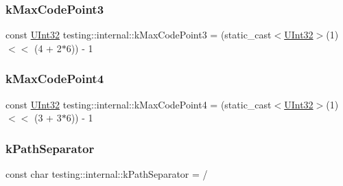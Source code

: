 \mbox{\label{namespacetesting_1_1internal_aa42bd507418e570402996e33582beed3}} 
\subsubsection{\texorpdfstring{kMaxCodePoint3}{kMaxCodePoint3}}
{\footnotesize\ttfamily const \mbox{\hyperlink{namespacetesting_1_1internal_a436defbb8e92c8e94e33ebcc86f278ba}{U\+Int32}} testing\+::internal\+::k\+Max\+Code\+Point3 = (static\+\_\+cast$<$\mbox{\hyperlink{namespacetesting_1_1internal_a436defbb8e92c8e94e33ebcc86f278ba}{U\+Int32}}$>$(1) $<$$<$ (4 + 2$\ast$6)) -\/ 1}

\mbox{\label{namespacetesting_1_1internal_acd87c60be9b5fedb2d017503d8834474}} 
\subsubsection{\texorpdfstring{kMaxCodePoint4}{kMaxCodePoint4}}
{\footnotesize\ttfamily const \mbox{\hyperlink{namespacetesting_1_1internal_a436defbb8e92c8e94e33ebcc86f278ba}{U\+Int32}} testing\+::internal\+::k\+Max\+Code\+Point4 = (static\+\_\+cast$<$\mbox{\hyperlink{namespacetesting_1_1internal_a436defbb8e92c8e94e33ebcc86f278ba}{U\+Int32}}$>$(1) $<$$<$ (3 + 3$\ast$6)) -\/ 1}

\mbox{\label{namespacetesting_1_1internal_afcd71adaa9d1e6df7b282a17fc48125c}} 
\subsubsection{\texorpdfstring{kPathSeparator}{kPathSeparator}}
{\footnotesize\ttfamily const char testing\+::internal\+::k\+Path\+Separator = \textquotesingle{}/\textquotesingle{}}

\mbox{\label{namespacetesting_1_1internal_abb38528ca6a45df265b19f5ccb3d16d9}} 
